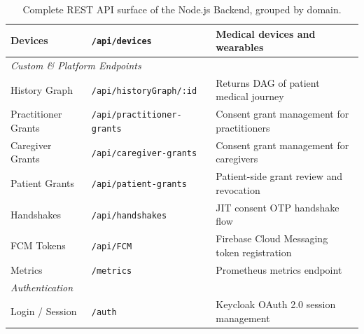 \begin{table}[H]
\begin{tabular}{|l|l|p{6.2cm}|}
        \hline
        Devices            & \texttt{/api/devices}              & Medical devices and wearables \\
        \hline
        \hline
        \multicolumn{3}{|l|}{\textit{Custom \& Platform Endpoints}} \\
        \hline
        History Graph      & \texttt{/api/historyGraph/:id}     & Returns DAG of patient medical journey \\
        \hline
        Practitioner Grants & \texttt{/api/practitioner-grants} & Consent grant management for practitioners \\
        \hline
        Caregiver Grants   & \texttt{/api/caregiver-grants}     & Consent grant management for caregivers \\
        \hline
        Patient Grants     & \texttt{/api/patient-grants}       & Patient-side grant review and revocation \\
        \hline
        Handshakes         & \texttt{/api/handshakes}           & JIT consent OTP handshake flow \\
        \hline
        FCM Tokens         & \texttt{/api/FCM}                  & Firebase Cloud Messaging token registration \\
        \hline
        Metrics            & \texttt{/metrics}                  & Prometheus metrics endpoint \\
        \hline
        \hline
        \multicolumn{3}{|l|}{\textit{Authentication}} \\
        \hline
        Login / Session    & \texttt{/auth}                     & Keycloak OAuth 2.0 session management \\
        \hline
    \end{tabular}
    \caption{Complete REST API surface of the Node.js Backend, grouped by domain.}
    \label{tab:api_endpoints}
\end{table}